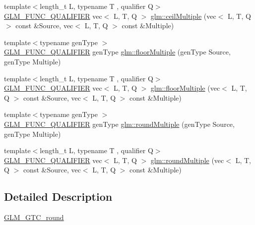 \begin{DoxyCompactItemize}
\item 
{\footnotesize template$<$length\+\_\+t L, typename T , qualifier Q$>$ }\\\mbox{\hyperlink{setup_8hpp_a33fdea6f91c5f834105f7415e2a64407}{G\+L\+M\+\_\+\+F\+U\+N\+C\+\_\+\+Q\+U\+A\+L\+I\+F\+I\+ER}} vec$<$ L, T, Q $>$ \mbox{\hyperlink{group__gtc__round_gab77fdcc13f8e92d2e0b1b7d7aeab8e9d}{glm\+::ceil\+Multiple}} (vec$<$ L, T, Q $>$ const \&Source, vec$<$ L, T, Q $>$ const \&Multiple)
\item 
{\footnotesize template$<$typename gen\+Type $>$ }\\\mbox{\hyperlink{setup_8hpp_a33fdea6f91c5f834105f7415e2a64407}{G\+L\+M\+\_\+\+F\+U\+N\+C\+\_\+\+Q\+U\+A\+L\+I\+F\+I\+ER}} gen\+Type \mbox{\hyperlink{group__gtc__round_ga2ffa3cd5f2ea746ee1bf57c46da6315e}{glm\+::floor\+Multiple}} (gen\+Type Source, gen\+Type Multiple)
\item 
{\footnotesize template$<$length\+\_\+t L, typename T , qualifier Q$>$ }\\\mbox{\hyperlink{setup_8hpp_a33fdea6f91c5f834105f7415e2a64407}{G\+L\+M\+\_\+\+F\+U\+N\+C\+\_\+\+Q\+U\+A\+L\+I\+F\+I\+ER}} vec$<$ L, T, Q $>$ \mbox{\hyperlink{group__gtc__round_gacdd8901448f51f0b192380e422fae3e4}{glm\+::floor\+Multiple}} (vec$<$ L, T, Q $>$ const \&Source, vec$<$ L, T, Q $>$ const \&Multiple)
\item 
{\footnotesize template$<$typename gen\+Type $>$ }\\\mbox{\hyperlink{setup_8hpp_a33fdea6f91c5f834105f7415e2a64407}{G\+L\+M\+\_\+\+F\+U\+N\+C\+\_\+\+Q\+U\+A\+L\+I\+F\+I\+ER}} gen\+Type \mbox{\hyperlink{group__gtc__round_gab892defcc9c0b0618df7251253dc0fbb}{glm\+::round\+Multiple}} (gen\+Type Source, gen\+Type Multiple)
\item 
{\footnotesize template$<$length\+\_\+t L, typename T , qualifier Q$>$ }\\\mbox{\hyperlink{setup_8hpp_a33fdea6f91c5f834105f7415e2a64407}{G\+L\+M\+\_\+\+F\+U\+N\+C\+\_\+\+Q\+U\+A\+L\+I\+F\+I\+ER}} vec$<$ L, T, Q $>$ \mbox{\hyperlink{group__gtc__round_ga2f1a68332d761804c054460a612e3a4b}{glm\+::round\+Multiple}} (vec$<$ L, T, Q $>$ const \&Source, vec$<$ L, T, Q $>$ const \&Multiple)
\end{DoxyCompactItemize}


\subsection{Detailed Description}
\mbox{\hyperlink{group__gtc__round}{G\+L\+M\+\_\+\+G\+T\+C\+\_\+round}} 